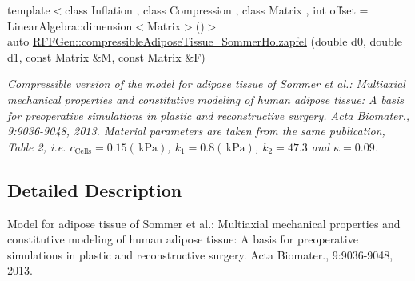 \begin{DoxyCompactItemize}
{\footnotesize template$<$class Inflation , class Compression , class Matrix , int offset = Linear\-Algebra\-::dimension$<$\-Matrix$>$()$>$ }\\auto \hyperlink{group__Biomechanics_ga3f3e0d2799629dab092114d59233bc03}{R\-F\-F\-Gen\-::compressible\-Adipose\-Tissue\-\_\-\-Sommer\-Holzapfel} (double d0, double d1, const Matrix \&M, const Matrix \&F)
\begin{DoxyCompactList}\small\item\em Compressible version of the model for adipose tissue of Sommer et al.\-: Multiaxial mechanical properties and constitutive modeling of human adipose tissue\-: A basis for preoperative simulations in plastic and reconstructive surgery. Acta Biomater., 9\-:9036-\/9048, 2013. Material parameters are taken from the same publication, Table 2, i.\-e. $c_\mathrm{Cells}=0.15 (\,\mathrm{kPa})$, $k_1=0.8 (\,\mathrm{kPa})$, $k_2=47.3$ and $\kappa=0.09$. \end{DoxyCompactList}\end{DoxyCompactItemize}


\subsection{Detailed Description}
Model for adipose tissue of Sommer et al.\-: Multiaxial mechanical properties and constitutive modeling of human adipose tissue\-: A basis for preoperative simulations in plastic and reconstructive surgery. Acta Biomater., 9\-:9036-\/9048, 2013. 